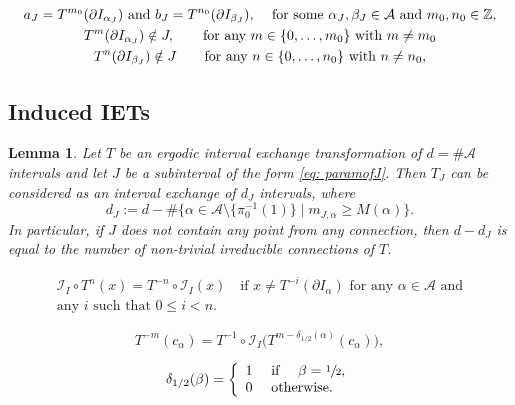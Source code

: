\documentclass[10pt,a4paper]{article}
\theoremstyle{plain}
\newtheorem{lemma}[theorem]{Lemma}
\theoremstyle{definition}
\newcommand{\A}{\mathcal{A}}
\newcommand{\I}{\mathcal{I}}
\newcommand{\Z}{\mathbb{Z}}
\begin{document}
\begin{equation}\label{eq: paramofJ}
\begin{gathered}
\text{$a_J=T^{m_0}(\partial I_{\alpha_J})$ and $b_J=T^{n_0}(\partial I_{\beta_J})$, \quad for some $\alpha_J,\beta_J\in\mathcal A$ and $m_0,n_0\in\Z$,} \\
T^{m}(\partial I_{\alpha_J})\notin J, \qquad \text{for any } m \in \{0, \ldots, m_0\} \text{ with } m \neq m_0 \\
T^n(\partial I_{\beta_J})\notin J \qquad \text{for any } n \in \{0, \ldots, n_0\} \text{ with } n \neq n_0,
\end{gathered}
\end{equation}

\subsection{Induced IETs}\label{sc:induced_IETs}

\begin{lemma}\label{lem: alphabetafetrconnections}
Let $T$ be an ergodic interval exchange transformation of $d=\#\A$ intervals and let $J$ be a subinterval of the form \eqref{eq: paramofJ}. Then $T_J$ can be considered as an interval exchange of $d_J$ intervals, where
\[
d_J:= d - \#\{\alpha\in\A\setminus \{\pi_0^{-1}(1)\} \mid m_{J,\alpha}\ge M(\alpha)\}.
\]
In particular, if $J$ does not contain any point from any connection, then $d-d_J$ is equal to the number of non-trivial irreducible connections of $T$.
\end{lemma}

\begin{multline}
\label{eq:generalized_conjugacy}
\mathcal{I}_I\circ T^n(x)=T^{-n}\circ\mathcal{I}_I(x) \quad \text{if } x \neq T^{-i}(\partial I_\alpha) \text{ for any } \alpha \in \A \text{ and}\\ \text{any $i$ such that } 0 \leq i < n.
\end{multline}

\begin{equation}
\label{eq:inverse_iterates}
T^{-m}(c_\alpha) =
{T^{-1} \circ \I_I} \big( T^{m - \delta_{1/2}(\alpha)}(c_\alpha) \big),
\end{equation}

\begin{equation}
\label{eq:delta_1/2}
\delta_{1/2}(\beta) = \left\{\begin{array}{ll} 1 & \text{ if } \quad \beta = \sfrac{1}{2}, \\
0 & \text{ otherwise}.
\end{array} \right.
\end{equation}
\end{document}
